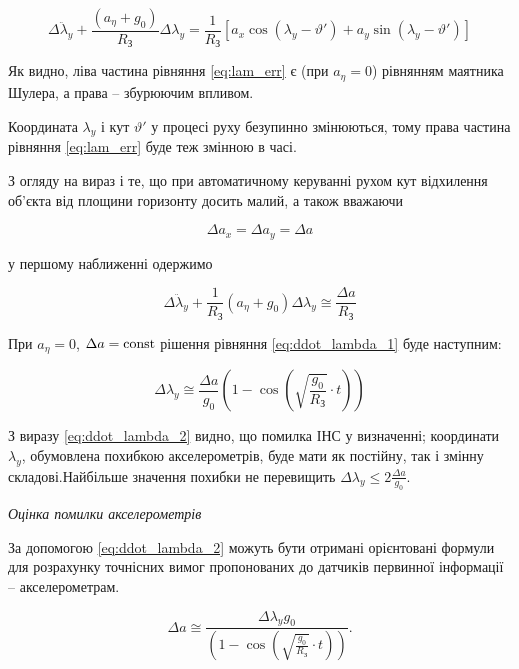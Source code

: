 \begin{equation} 
\label{eq:lam_err} 
\Delta \ddot{\lambda }_{y} +\frac{(a_{\eta } +g_{0} )}{R_{{\text{З}}} } 
\Delta \lambda _{y} =\frac{1}{R_{{\text{З}}} } \left[a_{x} \cos (\lambda _{y} -\vartheta ')+a_{y} \sin (\lambda _{y} -
\vartheta ')\right] 
\end{equation} 

Як видно, ліва частина рівняння \eqref{eq:lam_err} є (при $a_{\eta } =0$) рівнянням маятника Шулера, а права -- збурюючим впливом.

Координата $\lambda _{y} $ і кут $\vartheta '$ у процесі руху безупинно змінюються, тому права частина рівняння \eqref{eq:lam_err} 
буде теж змінною в часі.

З огляду на вираз і те, що при автоматичному керуванні рухом кут відхилення об'єкта від площини горизонту досить малий, а також вважаючи

\[\Delta a_{x} =\Delta a_{y} =\Delta a\] 

у першому наближенні одержимо

\begin{equation} 
\label{eq:ddot_lambda_1} 
\Delta \ddot{\lambda }_{y} +\frac{1}{R_{{\text{З}}} } (a_{\eta } +g_{0} )\Delta \lambda _{y} \cong \frac{\Delta a}{R_{{\text{З}}} }  
\end{equation} 

При $a_{\eta } =0$, $\Delta a={\rm const}$ рішення рівняння \eqref{eq:ddot_lambda_1} буде наступним:

\begin{equation} 
\label{eq:ddot_lambda_2} 
\Delta \lambda _{y} \cong \frac{\Delta a}{g_{0} } \left(1-\cos \left(\sqrt{\frac{g_{0} }{R_{{\text{З}}} } } \cdot t\right)\right) 
\end{equation} 

З виразу \eqref{eq:ddot_lambda_2} видно, що помилка ІНС у визначенні; координати $\lambda _{y} $, обумовлена похибкою акселерометрів, 
буде мати як постійну, так і змінну складові.Найбільше значення похибки не перевищить  $\Delta \lambda _{y} \le 2\frac{\Delta a}{g_{0} } $. 

\textit{Оцінка помилки акселерометрів}

За допомогою \eqref{eq:ddot_lambda_2} можуть бути отримані орієнтовані формули для розрахунку точнісних вимог пропонованих до датчиків первинної 
інформації -- акселерометрам.

\begin{equation} 
\label{eq:acc_err} 
\Delta a\cong \frac{\Delta \lambda _{y} g_{0} }{\left(1-\cos \left(\sqrt{\frac{g_{0} }{R_{{\text{З}}} } } \cdot t\right)\right)}.    
\end{equation} 

